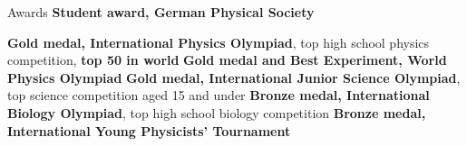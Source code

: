 \begin{rubric}{Awards}
\entry*[2012\hfill] \textbf{Student award, German Physical Society}

\entry*[2009      ] \textbf{Gold medal, International Physics Olympiad}, top high school physics competition, \textbf{top 50 in world}
\entry*[2011\hfill] \textbf{Gold medal and Best Experiment, World Physics Olympiad}
\entry*[2007-2008\hfill] \textbf{Gold medal, International Junior Science Olympiad}, top science competition aged 15 and under
\entry*[2010\hfill] \textbf{Bronze medal, International Biology Olympiad}, top high school biology competition
\entry*[2009\hfill] \textbf{Bronze medal, International Young Physicists' Tournament}

\end{rubric}
